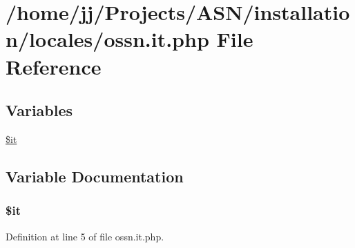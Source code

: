 \hypertarget{installation_2locales_2ossn_8it_8php}{}\section{/home/jj/\+Projects/\+A\+S\+N/installation/locales/ossn.it.\+php File Reference}
\label{installation_2locales_2ossn_8it_8php}
\subsection*{Variables}
\begin{DoxyCompactItemize}
\item 
\hyperlink{installation_2locales_2ossn_8it_8php_ac06ddca881bda7525c1a23103bdb60b3}{\$it}
\end{DoxyCompactItemize}


\subsection{Variable Documentation}
\subsubsection[{\texorpdfstring{\$it}{$it}}]{\setlength{\rightskip}{0pt plus 5cm}\$it}\hypertarget{installation_2locales_2ossn_8it_8php_ac06ddca881bda7525c1a23103bdb60b3}{}\label{installation_2locales_2ossn_8it_8php_ac06ddca881bda7525c1a23103bdb60b3}


Definition at line 5 of file ossn.\+it.\+php.

